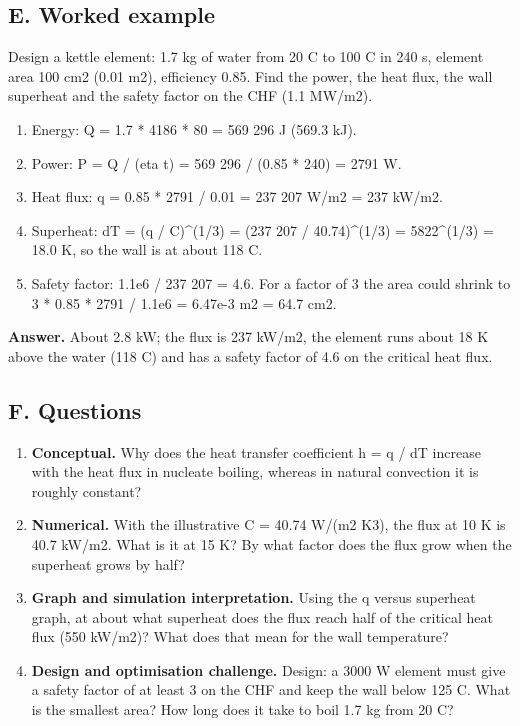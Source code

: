 \documentclass[11pt,a4paper]{article}
\begin{document}
\subsection*{E. Worked example}
Design a kettle element: 1.7 kg of water from 20 C to 100 C in 240 s, element area 100 cm2 (0.01 m2), efficiency 0.85. Find the power, the heat flux, the wall superheat and the safety factor on the CHF (1.1 MW/m2).
\begin{enumerate}[nosep]
\item Energy: Q = 1.7 * 4186 * 80 = 569 296 J (569.3 kJ).
\item Power: P = Q / (eta t) = 569 296 / (0.85 * 240) = 2791 W.
\item Heat flux: q = 0.85 * 2791 / 0.01 = 237 207 W/m2 = 237 kW/m2.
\item Superheat: dT = (q / C)\textasciicircum{}(1/3) = (237 207 / 40.74)\textasciicircum{}(1/3) = 5822\textasciicircum{}(1/3) = 18.0 K, so the wall is at about 118 C.
\item Safety factor: 1.1e6 / 237 207 = 4.6. For a factor of 3 the area could shrink to 3 * 0.85 * 2791 / 1.1e6 = 6.47e-3 m2 = 64.7 cm2.
\end{enumerate}
\textbf{Answer.} About 2.8 kW; the flux is 237 kW/m2, the element runs about 18 K above the water (118 C) and has a safety factor of 4.6 on the critical heat flux.

\subsection*{F. Questions}
\begin{enumerate}[nosep]
\item \textbf{Conceptual.} Why does the heat transfer coefficient h = q / dT increase with the heat flux in nucleate boiling, whereas in natural convection it is roughly constant?
\item \textbf{Numerical.} With the illustrative C = 40.74 W/(m2 K3), the flux at 10 K is 40.7 kW/m2. What is it at 15 K? By what factor does the flux grow when the superheat grows by half?
\item \textbf{Graph and simulation interpretation.} Using the q versus superheat graph, at about what superheat does the flux reach half of the critical heat flux (550 kW/m2)? What does that mean for the wall temperature?
\item \textbf{Design and optimisation challenge.} Design: a 3000 W element must give a safety factor of at least 3 on the CHF and keep the wall below 125 C. What is the smallest area? How long does it take to boil 1.7 kg from 20 C?
\end{enumerate}
\end{document}
